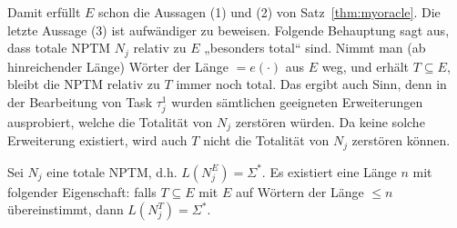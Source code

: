 Damit erfüllt $E$ schon die Aussagen (1) und (2) von Satz~\ref{thm:myoracle}. Die letzte Aussage (3) ist aufwändiger zu beweisen.
Folgende Behauptung sagt aus, dass totale NPTM $N_j$ relativ zu $E$ „besonders total“ sind. Nimmt man (ab hinreichender Länge) Wörter der Länge $=e(\cdot)$ aus $E$ weg, und erhält $T\subseteq E$, bleibt die NPTM relativ zu $T$ immer noch total. Das ergibt auch Sinn, denn in der Bearbeitung von Task $\tau^1_j$ wurden sämtlichen geeigneten Erweiterungen ausprobiert, welche die Totalität von $N_j$ zerstören würden. Da keine solche Erweiterung existiert, wird auch $T$ nicht die Totalität von $N_j$ zerstören können.

\begin{claim}\label{claim:myoracle-totality}
    Sei $N_j$ eine totale NPTM, d.h. $L(N_j^E)=\Sigma^*$.
    Es existiert eine Länge $n$ mit folgender Eigenschaft: 
    falls $T\subseteq E$ mit $E$ auf Wörtern der Länge $\leq n$ übereinstimmt, dann $L(N_j^T)=\Sigma^*$.
\end{claim}
